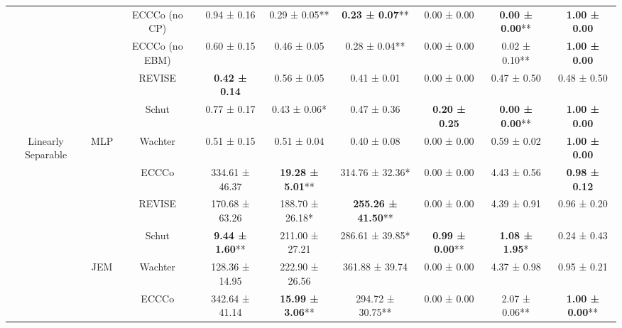 \begin{table}
{\begin{tabular}[t]{ccccccccc}
 &  & ECCCo (no CP) & 0.94 ± 0.16\hphantom{*}\hphantom{*} & 0.29 ± 0.05** & \textbf{0.23 ± 0.07}** & 0.00 ± 0.00\hphantom{*}\hphantom{*} & \textbf{0.00 ± 0.00}** & \textbf{1.00 ± 0.00}\hphantom{*}\hphantom{*}\\

 &  & ECCCo (no EBM) & 0.60 ± 0.15\hphantom{*}\hphantom{*} & 0.46 ± 0.05\hphantom{*}\hphantom{*} & 0.28 ± 0.04** & 0.00 ± 0.00\hphantom{*}\hphantom{*} & 0.02 ± 0.10** & \textbf{1.00 ± 0.00}\hphantom{*}\hphantom{*}\\

 &  & REVISE & \textbf{0.42 ± 0.14}\hphantom{*}\hphantom{*} & 0.56 ± 0.05\hphantom{*}\hphantom{*} & 0.41 ± 0.01\hphantom{*}\hphantom{*} & 0.00 ± 0.00\hphantom{*}\hphantom{*} & 0.47 ± 0.50\hphantom{*}\hphantom{*} & 0.48 ± 0.50\hphantom{*}\hphantom{*}\\

 &  & Schut & 0.77 ± 0.17\hphantom{*}\hphantom{*} & 0.43 ± 0.06*\hphantom{*} & 0.47 ± 0.36\hphantom{*}\hphantom{*} & \textbf{0.20 ± 0.25}\hphantom{*}\hphantom{*} & \textbf{0.00 ± 0.00}** & \textbf{1.00 ± 0.00}\hphantom{*}\hphantom{*}\\

\multirow[t]{-12}{*}{\centering\arraybackslash Linearly Separable} & \multirow[t]{-6}{*}{\centering\arraybackslash MLP} & Wachter & 0.51 ± 0.15\hphantom{*}\hphantom{*} & 0.51 ± 0.04\hphantom{*}\hphantom{*} & 0.40 ± 0.08\hphantom{*}\hphantom{*} & 0.00 ± 0.00\hphantom{*}\hphantom{*} & 0.59 ± 0.02\hphantom{*}\hphantom{*} & \textbf{1.00 ± 0.00}\hphantom{*}\hphantom{*}\\
\cmidrule{1-9}
 &  & ECCCo & 334.61 ± 46.37\hphantom{*}\hphantom{*} & \textbf{19.28 ± 5.01}** & 314.76 ± 32.36*\hphantom{*} & 0.00 ± 0.00\hphantom{*}\hphantom{*} & 4.43 ± 0.56\hphantom{*}\hphantom{*} & \textbf{0.98 ± 0.12}\hphantom{*}\hphantom{*}\\

 &  & REVISE & 170.68 ± 63.26\hphantom{*}\hphantom{*} & 188.70 ± 26.18*\hphantom{*} & \textbf{255.26 ± 41.50}** & 0.00 ± 0.00\hphantom{*}\hphantom{*} & 4.39 ± 0.91\hphantom{*}\hphantom{*} & 0.96 ± 0.20\hphantom{*}\hphantom{*}\\

 &  & Schut & \textbf{9.44 ± 1.60}** & 211.00 ± 27.21\hphantom{*}\hphantom{*} & 286.61 ± 39.85*\hphantom{*} & \textbf{0.99 ± 0.00}** & \textbf{1.08 ± 1.95}*\hphantom{*} & 0.24 ± 0.43\hphantom{*}\hphantom{*}\\

 & \multirow[t]{-4}{*}{\centering\arraybackslash JEM} & Wachter & 128.36 ± 14.95\hphantom{*}\hphantom{*} & 222.90 ± 26.56\hphantom{*}\hphantom{*} & 361.88 ± 39.74\hphantom{*}\hphantom{*} & 0.00 ± 0.00\hphantom{*}\hphantom{*} & 4.37 ± 0.98\hphantom{*}\hphantom{*} & 0.95 ± 0.21\hphantom{*}\hphantom{*}\\
\cmidrule{2-9}
 &  & ECCCo & 342.64 ± 41.14\hphantom{*}\hphantom{*} & \textbf{15.99 ± 3.06}** & 294.72 ± 30.75** & 0.00 ± 0.00\hphantom{*}\hphantom{*} & 2.07 ± 0.06** & \textbf{1.00 ± 0.00}**\\


\end{tabular}}
\end{table}
